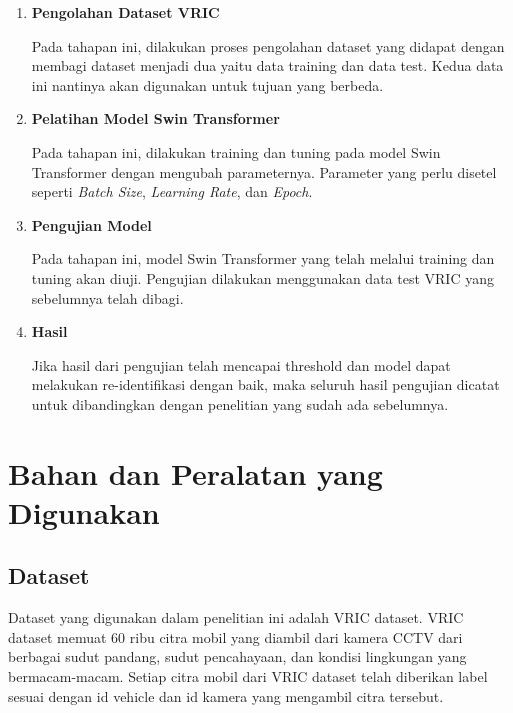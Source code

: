 \begin{enumerate}[nolistsep]

  \item \textbf{Pengolahan Dataset VRIC}
  
  Pada tahapan ini, dilakukan proses pengolahan dataset yang didapat dengan 
  membagi dataset menjadi dua yaitu data training dan data test. Kedua data 
  ini nantinya akan digunakan untuk tujuan yang berbeda.

  \item \textbf{Pelatihan Model Swin Transformer}
  
  Pada tahapan ini, dilakukan training dan tuning pada model Swin Transformer 
  dengan mengubah parameternya. Parameter yang perlu disetel seperti 
  \emph{Batch Size}, \emph{Learning Rate}, dan \emph{Epoch}.

  \item \textbf{Pengujian Model}
  
  Pada tahapan ini, model Swin Transformer yang telah melalui training dan 
  tuning akan diuji. Pengujian dilakukan menggunakan data test VRIC yang sebelumnya 
  telah dibagi.

  \item \textbf{Hasil}
  
  Jika hasil dari pengujian telah mencapai threshold dan model dapat melakukan \linebreak
  re-identifikasi dengan baik, maka seluruh hasil pengujian dicatat untuk dibandingkan 
  dengan penelitian yang sudah ada sebelumnya.

\end{enumerate}

\section{Bahan dan Peralatan yang Digunakan}
\label{sec:bahandanperalatanyangdigunakan}

\subsection{Dataset}

Dataset yang digunakan dalam penelitian ini adalah VRIC dataset. VRIC dataset memuat 
60 ribu citra mobil yang diambil dari kamera CCTV dari berbagai sudut pandang, sudut 
pencahayaan, dan kondisi lingkungan yang bermacam-macam. Setiap citra mobil dari VRIC 
dataset telah diberikan label sesuai dengan id vehicle dan id kamera yang mengambil 
citra tersebut.

